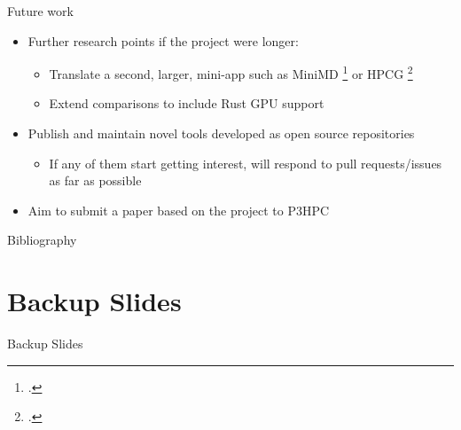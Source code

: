 \documentclass[10pt,aspectratio=169]{beamer}
\begin{document}
\begin{frame}{Future work}
    \begin{itemize}
        \item<1-> Further research points if the project were longer:
        \begin{itemize}
            \item Translate a second, larger, mini-app such as MiniMD \footcite{osti_1231191} or HPCG \footcite{dongarra2015hpcg}
            \item Extend comparisons to include Rust GPU support
        \end{itemize}
        \vspace{1cm}
        \item<2-> \alert{Publish and maintain novel tools developed} as open source repositories
        \begin{itemize}
            \item If any of them start getting interest, will respond to pull requests/issues as far as possible
        \end{itemize}
        \item<3-> \alert{Aim to submit a paper} based on the project to P3HPC
    \end{itemize}
\end{frame}

\maketitle

\appendix

%   
%   

\begin{frame}[allowframebreaks]{Bibliography}
    \printbibliography[heading=none]
\end{frame}

\section{Backup Slides}

\begin{frame}[label=backup]{Backup Slides}
    \hyperlink{demo}{}
\end{frame}
\end{document}
